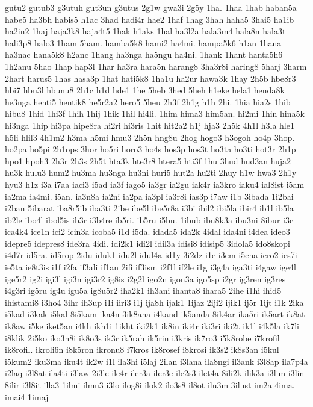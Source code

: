 {gutu2 gutub3 g3utuh gut3un g3utus 2g1w gwa3i 2g5y 1ha. 1haa 1hab haban5a
habe5 ha3bh habis5 h1ac 3had hadi4r hae2 1haf 1hag 3hah haha5 3hai5 ha1ib
ha2in2 1haj haja3k8 haja4t5 1hak h1aks 1hal ha3l2a hala3m4 hala8n hala3t
hali3p8 halo3 1ham 5ham. hamba5k8 hami2 ha4mi. hampa5k6 h1an 1hana ha3nac
hana5k8 h2anc 1hang ha3nga ha5ngu ha4ni. 1hank 1hant hanta5h6 1h2anu 5hao
1hap hap3l 1har ha3ra hara5n harang8 3ha3r8i haring8 5harj 3harm 2hart
harus5 1has hasa3p 1hat hati5k8 1ha1u ha2ur hawa3k 1hay 2h5b hbe8r3 hbi7
hbu3l hbunu8 2h1c h1d hde1 1he 5heb 3hed 5heh h1eke hela1 henda8k he3nga
henti5 hentik8 he5r2a2 hero5 5heu 2h3f 2h1g h1h 2hi. 1hia hia2s 1hib hibu8
1hid 1hi3f 1hih 1hij 1hik 1hil hi4li. 1him hima3 him5an. hi2mi 1hin hina5k
hi3nga 1hip hi3pa hipe8ra hi2ri hi3ris 1hit hit2a2 h1j hja3 2h5k 4h1l h3la
hle1 h5li hlil3 4h1m2 h3ma h5mi hmu3 2h5n hng8u 2hog hogo3 h3ogoh ho4p
3hop. ho2pa ho5pi 2h1ops 3hor ho5ri horo3 ho4s hos3p hos3t ho3ta ho3ti
hot3r 2h1p hpo1 hpoh3 2h3r 2h3s 2h5t hta3k hte3r8 htera5 hti3f 1hu 3hud
hud3an huja2 hu3k hulu3 hum2 hu3ma hu3nga hu3ni huri5 hut2a hu2ti 2huy h1w
hwa3 2h1y hyu3 h1z i3a i7aa iaci3 i5ad ia3f iago5 ia3gr ia2gu iak4r ia3kro
iaku4 ial8ist i5am ia2ma ia4mi. i5an. ia3n8a ia2ni ia2pa ia3pl ia3r8i
ias3p i7aw i1b 3ibada 1i2bai i2ban 5ibarat iba8r5ib iba3ti 2ibe ibe5l
ibe5r8a i3bi ibil2 ibi5la ibir4 ib1l ib5la ib2le ibo4l ibol5is ib3r i3b4re
ib5ri. ib5ru i5bu. 1ibub ibu8k3a ibu3ni 8ibur i3c ica4k4 ice1n ici2 icin3a
icoba5 i1d i5da. idada5 ida2k 4idal ida4ni i4dea ideo3 idepre5 idepres8
ide3ra 4idi. idi2k1 idi2l idil3a idisi8 idisip5 3idola5 ido8skopi i4d7r
id5ra. id5rop 2idu iduk1 idu2l idul4a id1y 3i2dz i1e i3em i5ena iero2
ies7i ie5ta ie8t3is i1f i2fa if3ali if1an 2ifi if3ism i2f1l if2le i1g
i3g4a iga3ti i4gaw ige4l ige5r2 ig2i igi3l igi3n igi3r2 ig8is i2g2l igo2n
igon3a igo5sp i2gr ig3ren ig3res i4g3ri ig5ru ig4u igu5a ig8u5r2 iha2k1
ih3ani ihanta8 ihara5 2ihe i1hi ihid5 ihistami8 i3ho4 3ihr ih3up i1i iiri3
i1j ija8h ijak1 1ijaz 2iji2 ijik1 ij5r 1ijt i1k 2ika i5kad i3kak i5kal
8i5kam ika4n 3ik8ana i4kand ik5anda 8ik4ar ika5ri ik5art ik8at ik8aw i5ke
iket5an i4kh ikh1i 1ikht iki2k1 ik8in iki4r iki3ri iki2t ik1l i4k5la ik7li
i8klik 2i5ko iko3n8i ik8o3s ik3r ik5rah ik5rin i3kris ik7ro3 i5k8robe
i7krofil ik8rofil. ikroli6n i8k5ron ikronu8 i7kros ik8rosef i8krosi ik3s2
ik8s3an i5kul i5kum2 iku3ma iku4t ik2w i1l ila3hi i5laj 2ilan i3lana
ila8ngi il3ank i3l8ap ila7p4a i2laq i3l8at ila4ti i3law 2i3le ile4r iler3a
iler3e ile2s3 ilet4a 8ili2k ilik3a i3lim i3lin 8ilir i3l8it illa3 1ilmi
ilmu3 i3lo ilog8i ilok2 ilo3s8 il8ot ilu3m 3ilust im2a 4ima. imai4 1imaj
}
